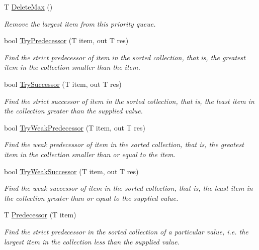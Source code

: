 \begin{DoxyCompactItemize}
T \hyperlink{class_c5_1_1_tree_set_ab9f0604e15a251e7dada671729d263aa}{Delete\+Max} ()
\begin{DoxyCompactList}\small\item\em Remove the largest item from this priority queue. \end{DoxyCompactList}\item 
bool \hyperlink{class_c5_1_1_tree_set_aa6449c864850016d6cba16c8fdb74b7e}{Try\+Predecessor} (T item, out T res)
\begin{DoxyCompactList}\small\item\em Find the strict predecessor of item in the sorted collection, that is, the greatest item in the collection smaller than the item. \end{DoxyCompactList}\item 
bool \hyperlink{class_c5_1_1_tree_set_ab274b61375263411d60daf0c1e0dc96c}{Try\+Successor} (T item, out T res)
\begin{DoxyCompactList}\small\item\em Find the strict successor of item in the sorted collection, that is, the least item in the collection greater than the supplied value. \end{DoxyCompactList}\item 
bool \hyperlink{class_c5_1_1_tree_set_a4e81634611ccdf789245ef2d6d6e3dd2}{Try\+Weak\+Predecessor} (T item, out T res)
\begin{DoxyCompactList}\small\item\em Find the weak predecessor of item in the sorted collection, that is, the greatest item in the collection smaller than or equal to the item. \end{DoxyCompactList}\item 
bool \hyperlink{class_c5_1_1_tree_set_aa5c8e3d8fde3c5546cac86cfa9f0a1d2}{Try\+Weak\+Successor} (T item, out T res)
\begin{DoxyCompactList}\small\item\em Find the weak successor of item in the sorted collection, that is, the least item in the collection greater than or equal to the supplied value. \end{DoxyCompactList}\item 
T \hyperlink{class_c5_1_1_tree_set_ae6709f8b11615490b30aca17edbd8d17}{Predecessor} (T item)
\begin{DoxyCompactList}\small\item\em Find the strict predecessor in the sorted collection of a particular value, i.\+e. the largest item in the collection less than the supplied value. \end{DoxyCompactList}\item 

\end{DoxyCompactItemize}

